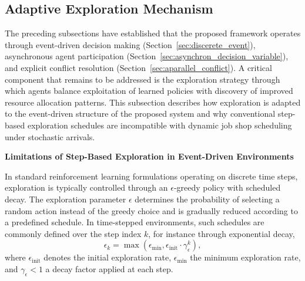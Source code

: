\subsection{Adaptive Exploration Mechanism}
\label{sec:adaptive_epsilon_decay}

The preceding subsections have established that the proposed framework operates through event-driven decision making (Section~\ref{sec:discerete_event}), asynchronous agent participation (Section~\ref{sec:asynchron_decision_variable}), and explicit conflict resolution (Section~\ref{sec:aparallel_conflict}). A critical component that remains to be addressed is the exploration strategy through which agents balance exploitation of learned policies with discovery of improved resource allocation patterns. This subsection describes how exploration is adapted to the event-driven structure of the proposed system and why conventional step-based exploration schedules are incompatible with dynamic job shop scheduling under stochastic arrivals.

\textbf{Limitations of Step-Based Exploration in Event-Driven Environments}

In standard reinforcement learning formulations operating on discrete time steps, exploration is typically controlled through an $\epsilon$-greedy policy with scheduled decay. The exploration parameter $\epsilon$ determines the probability of selecting a random action instead of the greedy choice and is gradually reduced according to a predefined schedule. In time-stepped environments, such schedules are commonly defined over the step index $k$, for instance through exponential decay,
\begin{equation}
\epsilon_k = \max\!\left(\epsilon_{\min}, \epsilon_{\mathrm{init}} \cdot \gamma_{\epsilon}^{k}\right),
\label{eq:step_based_epsilon_decay_generic}
\end{equation}
where $\epsilon_{\mathrm{init}}$ denotes the initial exploration rate, $\epsilon_{\min}$ the minimum exploration rate, and $\gamma_{\epsilon} < 1$ a decay factor applied at each step.


